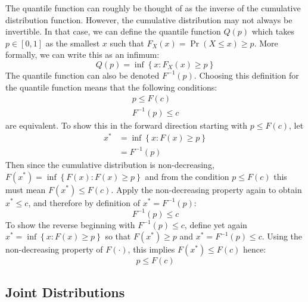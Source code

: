 \documentclass[11pt]{report} %
\begin{document}
The quantile function can roughly be thought of as the inverse of the cumulative distribution function. However, the cumulative distribution may not always be invertible. In that case, we can define the quantile function $Q\left(p\right)$ which takes $p\in\left[0, 1\right]$ as the smallest $x$ such that $F_{X}\left(x\right) = \operatorname{Pr}\left(X \leq x\right) \geq p$. More formally, we can write this as an infimum:
\begin{equation}
Q\left(p\right) = \inf\left\{x: F_{X}\left(x\right) \geq p\right\}
\end{equation}
The quantile function can also be denoted $F^{-1}\left(p\right)$. Choosing this definition for the quantile function means that the following conditions:
\begin{gather}
p \leq F\left(c\right) \\
F^{-1}\left(p\right) \leq c
\end{gather} 
are equivalent. To show this in the forward direction starting with $p \leq F\left(c\right)$, let
\begin{align}
x^{*} &= \inf\left\{x: F\left(x\right) \geq p\right\} \\
&= F^{-1}\left(p\right)
\end{align}
Then since the cumulative distribution is non-decreasing, $F\left(x^{*}\right) = \inf\left\{F\left(x\right): F\left(x\right) \geq p\right\}$ and from the condition $p \leq F\left(c\right)$ this must mean $F\left(x^{*}\right) \leq F\left(c\right)$. Apply the non-decreasing property again to obtain $x^{*} \leq c$, and therefore by definition of $x^{*} = F^{-1}\left(p\right)$:
\begin{equation}
F^{-1}\left(p\right) \leq c
\end{equation}
To show the reverse beginning with $F^{-1}\left(p\right) \leq c$, define yet again $x^{*} = \inf\left\{x: F\left(x\right) \geq p\right\}$ so that $F\left(x^{*}\right) \geq p$ and $x^{*} = F^{-1}\left(p\right) \leq c$. Using the non-decreasing property of $F\left(\cdot\right)$, this implies $F\left(x^{*}\right) \leq F\left(c\right)$ hence:
\begin{equation}
p \leq F\left(c\right)
\end{equation}


\subsection{Joint Distributions}
\end{document}
